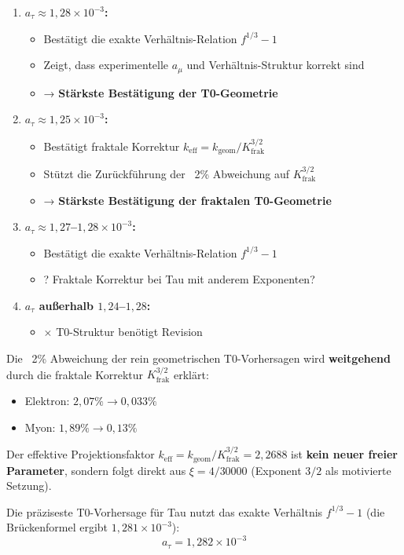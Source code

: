 	\begin{enumerate}
		\item \textbf{$a_\tau \approx 1{,}28 \times 10^{-3}$:}
		\begin{itemize}
			\item \checkmark{} Bestätigt die exakte Verhältnis-Relation $f^{1/3} - 1$
			\item \checkmark{} Zeigt, dass experimentelle $a_\mu$ und Verhältnis-Struktur korrekt sind
			\item → \textbf{Stärkste Bestätigung der T0-Geometrie}
		\end{itemize}
		
		\item \textbf{$a_\tau \approx 1{,}25 \times 10^{-3}$:}
		\begin{itemize}
			\item \checkmark{} Bestätigt fraktale Korrektur $k_{\text{eff}} = k_\text{geom}/K_\text{frak}^{3/2}$
			\item \checkmark{} Stützt die Zurückführung der ~2\% Abweichung auf $K_\text{frak}^{3/2}$
			\item → \textbf{Stärkste Bestätigung der fraktalen T0-Geometrie}
		\end{itemize}
		
		\item \textbf{$a_\tau \approx 1{,}27$--$1{,}28 \times 10^{-3}$:}
		\begin{itemize}
			\item \checkmark{} Bestätigt die exakte Verhältnis-Relation $f^{1/3} - 1$
			\item ? Fraktale Korrektur bei Tau mit anderem Exponenten?
		\end{itemize}
		
		\item \textbf{$a_\tau$ außerhalb $1{,}24$--$1{,}28$:}
		\begin{itemize}
			\item $\times$ T0-Struktur benötigt Revision
		\end{itemize}
	\end{enumerate}
	
	\begin{keypoint}[Kernaussage]
		Die ~2\% Abweichung der rein geometrischen T0-Vorhersagen wird \textbf{weitgehend} durch die fraktale Korrektur $K_\text{frak}^{3/2}$ erklärt:
		\begin{itemize}
			\item Elektron: $2{,}07\% \to 0{,}033\%$
			\item Myon: $1{,}89\% \to 0{,}13\%$
		\end{itemize}
		
		Der effektive Projektionsfaktor $k_\text{eff} = k_\text{geom}/K_\text{frak}^{3/2} = 2{,}2688$ ist \textbf{kein neuer freier Parameter}, sondern folgt direkt aus $\xi = 4/30000$ (Exponent $3/2$ als motivierte Setzung).
		
		Die präziseste T0-Vorhersage für Tau nutzt das exakte Verhältnis $f^{1/3} - 1$ (die Brückenformel ergibt $1{,}281 \times 10^{-3}$):
		\begin{equation}
			\boxed{a_\tau = 1{,}282 \times 10^{-3}}
		\end{equation}
	\end{keypoint}	
